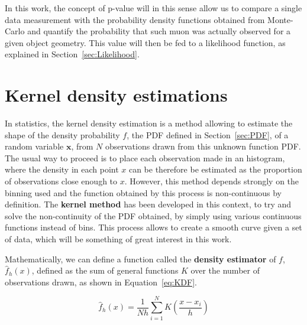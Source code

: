 \documentclass[a4paper, 11pt]{report}
\begin{document}
In this work, the concept of p-value will in this sense allow us to compare a single data measurement with the probability density functions obtained from Monte-Carlo and quantify the probability that such muon was actually observed for a given object geometry. This value will then be fed to a likelihood function, as explained in Section~\ref{sec:Likelihood}.

\section{Kernel density estimations} \label{sec:KDF}

In statistics, the kernel density estimation is a method allowing to estimate the shape of the density probability $f$, the PDF defined in Section~\ref{sec:PDF}, of a random variable $\bm x$, from $N$ observations drawn from this unknown function PDF. The usual way to proceed is to place each observation made in an histogram, where the density in each point $x$ can be therefore be estimated as the proportion of observations close enough to $x$. However, this method depends strongly on the binning used and the function obtained by this process is non-continuous by definition. The \textbf{kernel method} has been developed in this context, to try and solve the non-continuity of the PDF obtained, by simply using various continuous functions instead of bins. This process allows to create a smooth curve given a set of data, which will be something of great interest in this work.

Mathematically, we can define a function called the \textbf{density estimator} of $f$, $\hat{f}_h(x)$, defined as the sum of general functions $K$ over the number of observations drawn, as shown in Equation~\ref{eq:KDF}.

\begin{equation}
\label{eq:KDF}
\hat{f}_h(x) = \frac{1}{Nh} \sum_{i=1}^{N} K \left (\frac{x-x_i}{h} \right )
\end{equation}
\end{document}
